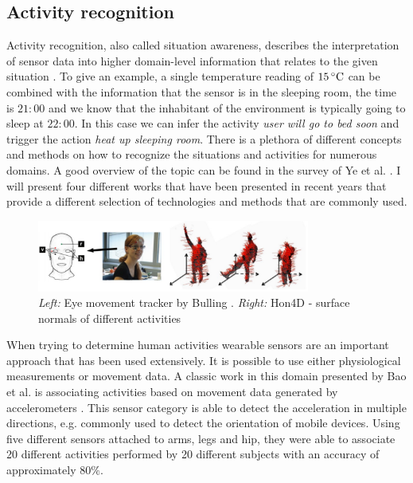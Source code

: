 \subsection{Activity recognition}
Activity recognition, also called situation awareness, describes the interpretation of sensor data into higher domain-level information that relates to the given situation \cite{ye2012situation}. To give an example, a single temperature reading of $15\,^{\circ}{\rm C}$ can be combined with the information that the sensor is in the sleeping room, the time is $21:00$ and we know that the inhabitant of the environment is typically going to sleep at $22:00$. In this case we can infer the activity \emph{user will go to bed soon} and trigger the action \emph{heat up sleeping room}. There is a plethora of different concepts and methods on how to recognize the situations and activities for numerous domains. A good overview of the topic can be found in the survey of Ye et al. \cite{ye2012situation}. I will present four different works that have been presented in recent years that provide a different selection of technologies and methods that are commonly used.

\begin{figure}[ht]
\centering
\includegraphics[width=0.8\textwidth]{images/rel_app_activity}
\caption{\emph{Left:} Eye movement tracker by Bulling \cite{bulling2011eye}. \emph{Right:} Hon4D - surface normals of different activities \cite{oreifej2013hon4d}}
\label{fig:rel_app_activity}
\end{figure}	

When trying to determine human activities wearable sensors are an important approach that has been used extensively. It is possible to use either physiological measurements or movement data. A classic work in this domain presented by Bao et al. is associating activities based on movement data generated by accelerometers \cite{Bao2004}. This sensor category is able to detect the acceleration in multiple directions, e.g. commonly used to detect the orientation of mobile devices. Using five different sensors attached to arms, legs and hip, they were able to associate 20 different activities performed by 20 different subjects with an accuracy of approximately $80\%$.

